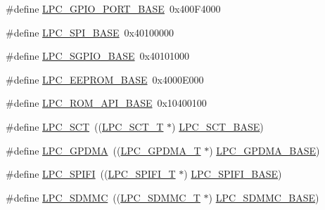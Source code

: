 \begin{DoxyCompactItemize}
\#define \hyperlink{group___p_e_r_i_p_h__18_x_x___b_a_s_e_ga7de0e57c07a6bd4ff8cf9f2b85249ed4}{L\+P\+C\+\_\+\+G\+P\+I\+O\+\_\+\+P\+O\+R\+T\+\_\+\+B\+A\+SE}~0x400\+F4000
\item 
\#define \hyperlink{group___p_e_r_i_p_h__18_x_x___b_a_s_e_gaf611188188574ba805b6de71acc88c6c}{L\+P\+C\+\_\+\+S\+P\+I\+\_\+\+B\+A\+SE}~0x40100000
\item 
\#define \hyperlink{group___p_e_r_i_p_h__18_x_x___b_a_s_e_ga3e50d6c46ad4612cde93035a12b204a8}{L\+P\+C\+\_\+\+S\+G\+P\+I\+O\+\_\+\+B\+A\+SE}~0x40101000
\item 
\#define \hyperlink{group___p_e_r_i_p_h__18_x_x___b_a_s_e_ga9d1fcaafb9feb0f8253c3cef1edc7e9f}{L\+P\+C\+\_\+\+E\+E\+P\+R\+O\+M\+\_\+\+B\+A\+SE}~0x4000\+E000
\item 
\#define \hyperlink{group___p_e_r_i_p_h__18_x_x___b_a_s_e_ga2ae00d891b7603694f3a1eb640013f63}{L\+P\+C\+\_\+\+R\+O\+M\+\_\+\+A\+P\+I\+\_\+\+B\+A\+SE}~0x10400100
\item 
\#define \hyperlink{group___p_e_r_i_p_h__18_x_x___b_a_s_e_gace25d349a4ffff2cd63e5f2c6d127509}{L\+P\+C\+\_\+\+S\+CT}~((\hyperlink{struct_l_p_c___s_c_t___t}{L\+P\+C\+\_\+\+S\+C\+T\+\_\+T}              $\ast$) \hyperlink{group___p_e_r_i_p_h__43_x_x___b_a_s_e_gad39ca0e94488b4bee5510b2e8bc5a708}{L\+P\+C\+\_\+\+S\+C\+T\+\_\+\+B\+A\+SE})
\item 
\#define \hyperlink{group___p_e_r_i_p_h__18_x_x___b_a_s_e_gaf9d4b843ddff8d08a27880f90e2dbf18}{L\+P\+C\+\_\+\+G\+P\+D\+MA}~((\hyperlink{struct_l_p_c___g_p_d_m_a___t}{L\+P\+C\+\_\+\+G\+P\+D\+M\+A\+\_\+T}            $\ast$) \hyperlink{group___p_e_r_i_p_h__43_x_x___b_a_s_e_ga51ba8e3f33730fa2b78be3f892d8c278}{L\+P\+C\+\_\+\+G\+P\+D\+M\+A\+\_\+\+B\+A\+SE})
\item 
\#define \hyperlink{group___p_e_r_i_p_h__18_x_x___b_a_s_e_gaa6445e9b3756a585e42bb068a305f879}{L\+P\+C\+\_\+\+S\+P\+I\+FI}~((\hyperlink{group___l_p_c_s_p_i_f_i_l_i_b___h_w___a_p_i_ga69ca4e6bace5ac7e7a2ae3cdc0d569b3}{L\+P\+C\+\_\+\+S\+P\+I\+F\+I\+\_\+T}            $\ast$) \hyperlink{group___p_e_r_i_p_h__43_x_x___b_a_s_e_gad284a5971366e0a8b5fe9881fdb9aa0c}{L\+P\+C\+\_\+\+S\+P\+I\+F\+I\+\_\+\+B\+A\+SE})
\item 
\#define \hyperlink{group___p_e_r_i_p_h__18_x_x___b_a_s_e_ga0dad86ccae5b13170e0204ed651a2847}{L\+P\+C\+\_\+\+S\+D\+M\+MC}~((\hyperlink{struct_l_p_c___s_d_m_m_c___t}{L\+P\+C\+\_\+\+S\+D\+M\+M\+C\+\_\+T}            $\ast$) \hyperlink{group___p_e_r_i_p_h__43_x_x___b_a_s_e_ga4175c6e418d0b209c42f789cfa9ff32b}{L\+P\+C\+\_\+\+S\+D\+M\+M\+C\+\_\+\+B\+A\+SE})
\item 

\end{DoxyCompactItemize}
